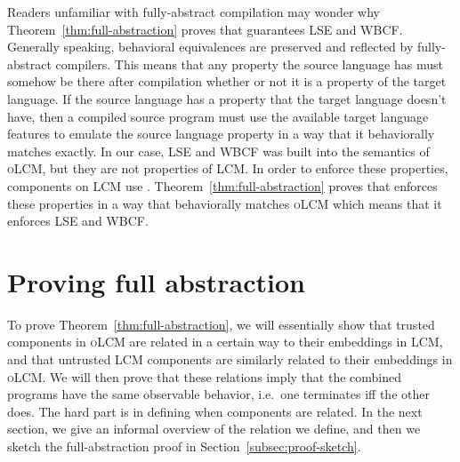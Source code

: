 \documentclass[acmsmall,screen]{acmart}\settopmatter{}
\newcommand{\trgcm}{\textsc{LCM}}
\newcommand{\srccm}{\textsc{oLCM}}
\begin{document}
Readers unfamiliar with fully-abstract compilation may wonder why Theorem~\ref{thm:full-abstraction} proves that \stktokens{} guarantees LSE and WBCF.
Generally speaking, behavioral equivalences are preserved and reflected by fully-abstract compilers.
This means that any property the source language has must somehow be there after compilation whether or not it is a property of the target language.
If the source language has a property that the target language doesn't have, then a compiled source program must use the available target language features to emulate the source language property in a way that it behaviorally matches exactly.
In our case, LSE and WBCF was built into the semantics of \srccm{}, but they are not properties of \trgcm{}.
In order to enforce these properties, components on \trgcm{} use \stktokens{}.
Theorem~\ref{thm:full-abstraction} proves that \stktokens{} enforces these properties in a way that behaviorally matches \srccm{} which means that it enforces LSE and WBCF.




\section{Proving full abstraction}
\label{sec:fa-proof}
To prove Theorem~\ref{thm:full-abstraction}, we will essentially show that trusted components in \srccm{} are related in a certain way to their embeddings in \trgcm{}, and that untrusted \trgcm{} components are similarly related to their embeddings in \srccm{}.
We will then prove that these relations imply that the combined programs have the same observable behavior, i.e.\ one terminates iff the other does.
The hard part is in defining when components are related.
In the next section, we give an informal overview of the relation we define, and then we sketch the full-abstraction proof in Section~\ref{subsec:proof-sketch}.
\end{document}
